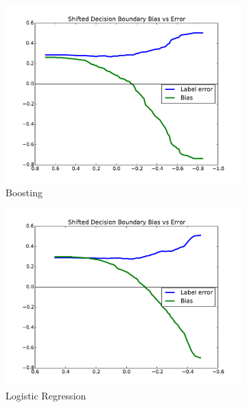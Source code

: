 \documentclass[conference]{IEEEtran}
\begin{document}
\begin{figure}[t]
\centering
\begin{subfigure}{.7\columnwidth}
\includegraphics[width=\columnwidth]{images/singles-boosting-T.pdf}%
\caption{Boosting}%
\label{fig:singles_boosting_tradeoff}%
\end{subfigure}%
\begin{subfigure}{.7\columnwidth}
\includegraphics[width=\columnwidth]{images/singles-lr-T.pdf}%
\caption{Logistic Regression}%
\label{fig:singles_lr_tradeoff}%
\end{subfigure}%
\begin{subfigure}{.7\columnwidth}

\end{subfigure}
\end{figure}
\end{document}
